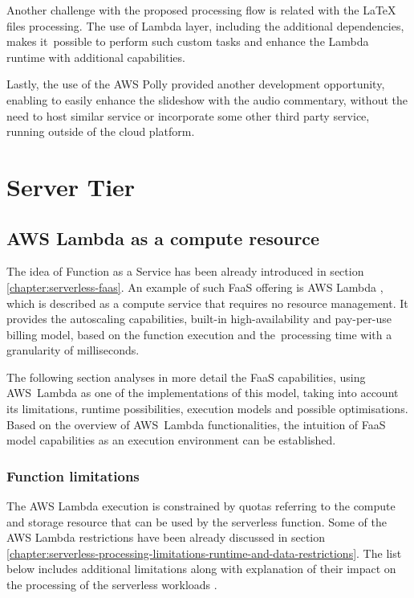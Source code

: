 Another challenge with the proposed processing flow is related with the LaTeX files processing. The use of Lambda layer, including the additional dependencies, makes it~possible to perform such custom tasks and enhance the Lambda runtime with additional capabilities.

Lastly, the use of the AWS Polly provided another development opportunity, enabling to easily enhance the slideshow with the audio commentary, without the need to host similar service or incorporate some other third party service, running outside of the cloud platform.

\newpage

\section{Server Tier}

\subsection{AWS Lambda as a compute resource} \label{chapter:lambda-function-as-a-compute-resource}

The idea of Function as a Service has been already introduced in section \ref{chapter:serverless-faas}.
An example of such FaaS offering is AWS Lambda \cite{AWSLambda}, which is described as a compute service that requires no resource management. It provides the autoscaling capabilities, built-in high-availability and pay-per-use billing model, based on the function execution and the~processing time with a granularity of milliseconds. 

The following section analyses in more detail the FaaS capabilities, using AWS~Lambda as one of the implementations of this model, taking into account its limitations, runtime possibilities, execution models and possible optimisations.
Based on the overview of AWS~Lambda functionalities, the intuition of FaaS model capabilities as an execution environment can be established.

\subsubsection{Function limitations} \label{chapter:lambda-function-limitations}

The AWS Lambda execution is constrained by quotas referring to the compute and storage resource that can be used by the serverless function.
Some of the AWS Lambda restrictions have been already discussed in section \ref{chapter:serverless-processing-limitations-runtime-and-data-restrictions}.
The list below includes additional limitations along with explanation of their impact on the processing of the serverless workloads \cite{AWSLambdaQuotas}.

